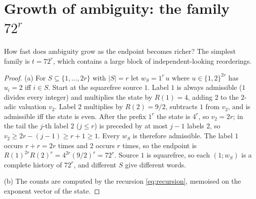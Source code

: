 \section{Growth of ambiguity: the family \texorpdfstring{$72^r$}{72 to the r}}
How fast does ambiguity grow as the endpoint becomes richer? The simplest family is $t=72^r$, which contains a large block of independent-looking reorderings.

\begin{proof}
(a) For $S\subseteq\{1,\dots,2r\}$ with $|S|=r$ let $w_S=1^r\,u$ where $u\in\{1,2\}^{2r}$ has $u_i=2$ iff $i\in S$. Start at the squarefree source $1$. Label $1$ is always admissible ($1$ divides every integer) and multiplies the state by $R(1)=4$, adding $2$ to the $2$-adic valuation $v_2$. Label $2$ multiplies by $R(2)=9/2$, subtracts $1$ from $v_2$, and is admissible iff the state is even. After the prefix $1^r$ the state is $4^r$, so $v_2=2r$; in the tail the $j$-th label $2$ ($j\le r$) is preceded by at most $j-1$ labels $2$, so $v_2\ge2r-(j-1)\ge r+1\ge1$. Every $w_S$ is therefore admissible. The label $1$ occurs $r+r=2r$ times and $2$ occurs $r$ times, so the endpoint is $R(1)^{2r}R(2)^r=4^{2r}(9/2)^r=72^r$. Source $1$ is squarefree, so each $(1;w_S)$ is a complete history of $72^r$, and different $S$ give different words.

(b) The counts are computed by the recursion \eqref{eq:recursion}, memoised on the exponent vector of the state.
\end{proof}
